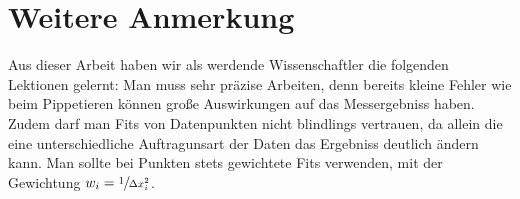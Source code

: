 \section{Weitere Anmerkung}
Aus dieser Arbeit haben wir als werdende Wissenschaftler die folgenden Lektionen gelernt:\newline
Man muss sehr präzise Arbeiten, denn bereits kleine Fehler wie beim Pippetieren können große Auswirkungen auf
das Messergebniss haben.
Zudem darf man Fits von Datenpunkten nicht blindlings vertrauen, da allein die eine unterschiedliche
Auftragunsart der Daten das Ergebniss deutlich ändern kann. Man sollte bei Punkten stets gewichtete Fits verwenden,
mit der Gewichtung $ w_i = \sfrac{1}{\Delta x_i^2}$.


